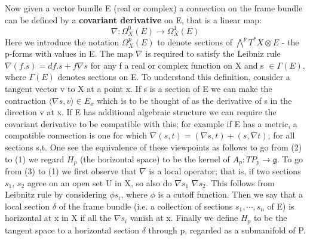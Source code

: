 Now given a vector bundle E (real or complex) a connection on the frame bundle can be defined by a \textbf{covariant derivative}
on E, that is a linear map:
\begin{equation}
 \nabla: \Omega_{X}^{0}(E) \rightarrow \Omega_X^1(E)
\end{equation}
Here we introduce the notation $\Omega^p_X(E)$ to denote sections of 
$\bigwedge^pT^*X \otimes E$ - the p-forms with values in E. The map 
$\nabla$ is required to satisfy the Leibniz rule 
$\nabla(f.s) = df.s + f\nabla s$ for any f a real or complex function on X and s $\in \Gamma(E)$, where $\Gamma(E)$ 
denotes sections on E. 
   To understand this definition, consider a tangent vector v to X at a point x. If s is a section of E we can make 
   the contraction $\langle \nabla s, v \rangle \in E_x$ which is to be thought of as the derivative of s in the 
   direction v at x. If E has additional algebraic structure we can require the covariant derivative to be compatible 
   with this; for example if E has a metric, a compatible connection is one for which $\nabla(s,t) = (\nabla s, t) + (s, 
   \nabla t)$, for all sections s,t. 
      One see the equivalence of these viewpoints as follows to go from (2) to (1) we regard $H_p$ (the horizontal 
    space) to be the kernel of $A_p: TP_{p} \rightarrow \mathfrak{g}$.
  To go from (3) to (1) we first observe that $\nabla$ is a local operator; that is, if two sections $s_1$, $s_2$
  agree on an open set U in X, so also do $\nabla s_1$ $\nabla s_2$. 
  This follows from Leibnitz rule by considering $\phi s_i$, where $\phi$ is a cutoff function. 
 Then we say that a local section $\delta$ of the frame bundle (i.e. a collection of sections $s_1,\cdots, s_n$ of E)
 is horizontal at x in X if all the $\nabla s_i$ vanish at x. Finally we define $H_p$ to be the tangent space to a 
 horizontal section $\delta$ through p, regarded as a submanifold of P. 
 

